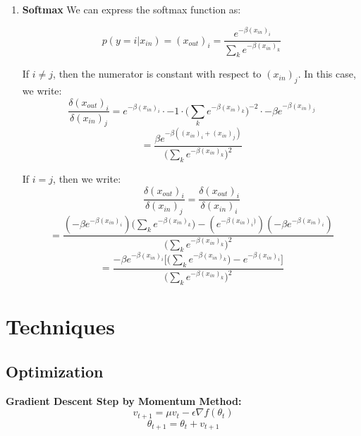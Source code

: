 \documentclass[a4paper]{article}
\begin{document}
\begin{enumerate}
{}

\item{ \textbf{Softmax} 
\newline
\newline
We can express the softmax function as:

$$p(y=i|x_{in}) = (x_{out})_i = \frac{e^{- \beta (x_{in})_i }}{ \sum_k e^{- \beta (x_{in})_k } }$$

If $i \neq j$, then the numerator is constant with respect to $(x_{in})_j$. In this case, we write:
$$\frac{\delta (x_{out})_i}{ \delta (x_{in})_j } 
= e^{- \beta (x_{in})_i} \cdot -1 \cdot  \Big( \sum_k e^{- \beta (x_{in})_k} \Big)^{-2} \cdot - \beta e^{- \beta (x_{in})_j } $$
$$ = \frac{\beta e^{-\beta ( (x_{in})_i + (x_{in})_j )}}{ \Big( \sum_k e^{- \beta (x_{in})_k} \Big)^2} $$

If $i = j$, then we write:
$$\frac{\delta (x_{out})_i}{ \delta (x_{in})_j } = \frac{\delta (x_{out})_i}{ \delta (x_{in})_i } $$
$$ = \frac{ (-\beta e^{-\beta (x_{in})_i } ) \Big( \sum_k e^{- \beta (x_{in})_k} \Big) - (e^{-\beta (x_{in})_i )}) ( - \beta e^{-\beta (x_{in})_i  })}{\Big( \sum_k e^{- \beta (x_{in})_k} \Big)^2}$$
$$ = \frac{ - \beta e^{- \beta (x_{in})_i }  \Bigg[ \Big( \sum_k e^{- \beta (x_{in})_k} \Big) - e^{-\beta (x_{in})_i}  \Bigg] } {\Big( \sum_k e^{- \beta (x_{in})_k} \Big)^2 } $$

}
\end{enumerate}

\section{Techniques}
\subsection{Optimization}

\textbf{Gradient Descent Step by Momentum Method:}
$$v_{t+1} = \mu v_t - \epsilon \nabla f(\theta_t) $$
$$\theta_{t+1} = \theta_t + v_{t+1}$$
\end{document}
